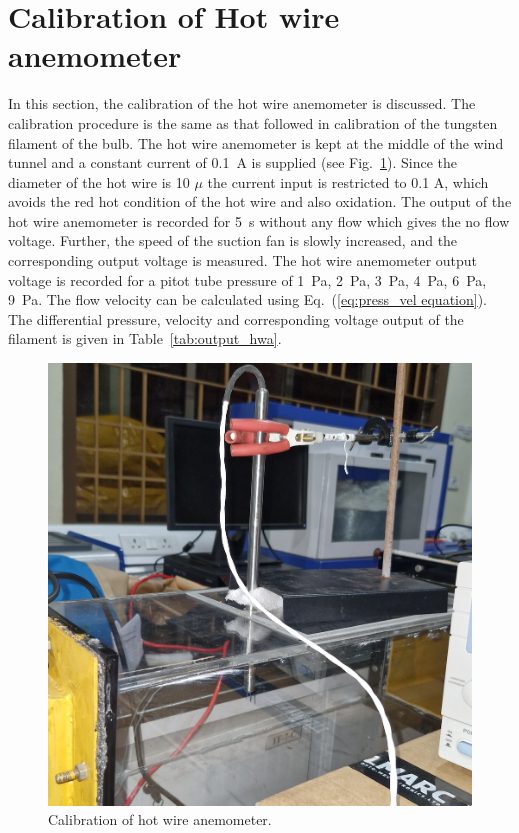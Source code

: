 \section{Calibration of Hot wire anemometer}
In this section, the calibration of the hot wire anemometer is discussed. The calibration procedure is the same as that followed in calibration of the tungsten filament of the bulb. The hot wire anemometer is kept at the middle of the wind tunnel and a constant current of 0.1~A is supplied (see Fig.~\ref{fig:calibration_HWA}). Since the diameter of the hot wire is 10 $\mu$ the current input is restricted to 0.1 A, which avoids the red hot condition of the hot wire and also oxidation. The output of the hot wire anemometer is recorded for 5~s without any flow which gives the no flow voltage. Further, the speed of the suction fan is slowly increased, and the corresponding output voltage is measured. The hot wire anemometer output voltage is recorded for a pitot tube pressure of 1~Pa, 2~Pa, 3~Pa, 4~Pa, 6~Pa, 9~Pa. The flow velocity can be calculated using Eq.~(\ref{eq:press_vel equation}). The differential pressure, velocity and corresponding voltage output of the filament is given in Table~\ref{tab:output_hwa}.
\begin{figure}[ht]
    \centering
    \includegraphics[width=0.5\linewidth]{gfx/HWA_CC_Calibration.jpeg}
    \caption{Calibration of hot wire anemometer.}
    \label{fig:calibration_HWA}
\end{figure}
